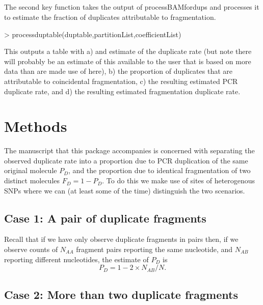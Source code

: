 \documentclass{article}
\begin{document}
\subsection{}

The second key function takes the output of processBAMfordups and processes it to estimate the fraction of duplicates attributable to fragmentation.

\begin{Schunk}
\begin{Sinput}
> processduptable(duptable,partitionList,coefficientList)
\end{Sinput}
\end{Schunk}

This outputs a table with a) and estimate of the duplicate rate (but note there will probably be an estimate of this available to the user that is based on more data than are made use of here), b) the proportion of duplicates that are attributable to coincidental fragmentation, c) the resulting estimated PCR duplicate rate, and d) the resulting estimated fragmentation duplicate rate.
\clearpage{}

\section{Methods}



The manuscript that this package accompanies is concerned with separating the observed duplicate rate into a proportion due to PCR duplication of the same original molecule $P_D$, and the proportion due to identical fragmentation of two distinct molecules $F_D = 1-P_D$. To do this we make use of sites of heterogenous SNPs where we can (at least some of the time) distinguish the two scenarios.

\subsection{Case 1: A pair of duplicate fragments}

Recall that if we have only observe duplicate fragments in pairs then, if we observe counts of $N_{AA}$ fragment pairs reporting the same nucleotide, and $N_{AB}$ reporting different nucleotides, the estimate of $P_D$ is
\begin{equation} \label{eq:M2}
P_D = 1- 2 \times N_{AB}/N.
\end{equation} 

\subsection{Case 2: More than two duplicate fragments}
\label{subsec:Case2}
\end{document}
